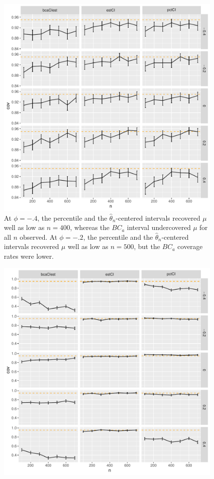 \documentclass[12pt, letterpaper, titlepage]{article}
\begin{document}
\begin{figure}[tbp]
  \centering
  \includegraphics[width=\textwidth]{figures/plot_sigma}
  \caption{At $\phi = -.4$, the percentile and the
    $\hat{\theta}_{n}$-centered intervals recovered $\mu$ well as low as
    $n = 400$, whereas the $BC_a$ interval undercovered $\mu$ for all $n$
    observed. At $\phi = -.2$, the percentile and the
    $\hat{\theta}_{n}$-centered intervals recovered $\mu$ well as low as
    $n = 500$, but the $BC_a$ coverage rates were lower.}
  \label{fig:plot_sigma}
\end{figure}


\begin{figure}[tbp]
  \centering
  \includegraphics[width=\textwidth]{figures/plot_phi}
  \caption{}
  \label{fig:plot_phi}
\end{figure}
\end{document}
